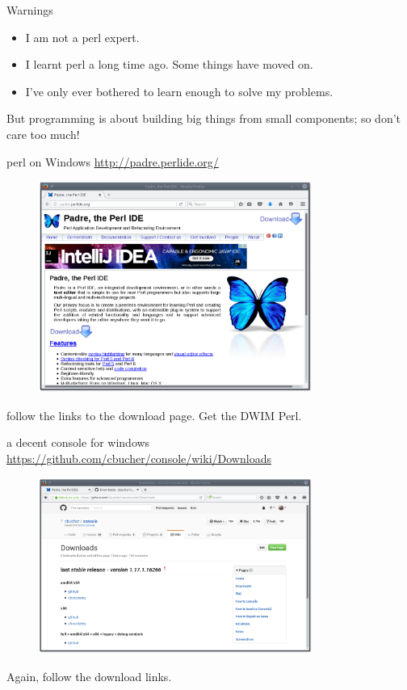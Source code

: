 \documentclass[pdf]{beamer}
\begin{document}
\begin{frame}{Warnings}
  \begin{itemize}
  \item I am not a perl expert.
  \item I learnt perl a long time ago. Some things have moved on.
  \item I've only ever bothered to learn enough to solve my problems.
  \end{itemize}

  But programming is about building big things from small components; so don't
  care too much!
    
\end{frame}

\begin{frame}{perl on Windows}
  \url{http://padre.perlide.org/}
  \begin{figure}[ht]
    \includegraphics[width=0.8\textwidth]{images/padre_website.png}
  \end{figure}
  follow the links to the download page. Get the DWIM Perl.
\end{frame}

\begin{frame}{a decent console for windows}
  \url{https://github.com/cbucher/console/wiki/Downloads}
  \begin{figure}[ht]
    \includegraphics[width=0.8\textwidth]{images/consolez_website.png}
  \end{figure}
  Again, follow the download links.
\end{frame}
\end{document}
